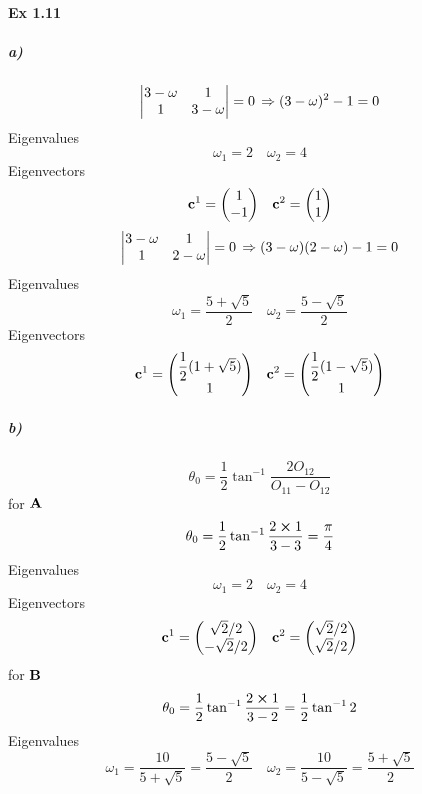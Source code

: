 \documentclass[a4paper]{article}
\DeclareMathOperator{\dra}{\Rightarrow}
\newcommand{\ex}[1]{\paragraph{Ex #1}}
\newcommand{\subex}[1]{\subparagraph{#1}}
\numberwithin{equation}{subsection}
\begin{document}
\ex{1.11}
\subex{a)}
\begin{equation}\label{key}
\mqty| 3-\omega & 1\\1 & 3-\omega| = 0 \;\dra\; (3-\omega)^2 - 1 = 0
\end{equation}
Eigenvalues
\begin{equation}\label{key}
\omega_1 = 2 \quad \omega_2 = 4
\end{equation}
Eigenvectors
\begin{equation}\label{key}
\vb{c}^1 = \mqty(1\\-1) \quad \vb{c}^2 = \mqty(1\\1)
\end{equation}
\begin{equation}\label{key}
\mqty|3-\omega & 1\\1 & 2-\omega| = 0 \;\dra\; (3-\omega)(2-\omega) - 1 = 0
\end{equation}
Eigenvalues
\begin{equation}\label{key}
\omega_1 = \dfrac{5+\sqrt{5}}{2} \quad \omega_2 = \dfrac{5-\sqrt{5}}{2}
\end{equation}
Eigenvectors
\begin{equation}\label{key}
\vb{c}^1 = \mqty(\dfrac{1}{2}(1+\sqrt{5})\\1) \quad \vb{c}^2 = \mqty(\dfrac{1}{2}(1-\sqrt{5})\\1)
\end{equation}
\subex{b)}
\begin{equation}\label{key}
\theta_0 = \dfrac{1}{2}\tan^{-1}\dfrac{2O_{12}}{O_{11}-O_{12}}
\end{equation}
for $ \vb{A} $
\begin{equation}\label{key}
\theta_0 = \dfrac{1}{2}\tan^{-1}\dfrac{2\cross 1}{3-3} = \dfrac{\pi}{4} 
\end{equation}
Eigenvalues
\begin{equation}\label{key}
\omega_1 = 2 \quad \omega_2 = 4
\end{equation}
Eigenvectors
\begin{equation}\label{key}
\vb{c}^1 = \mqty(\sqrt{2}/2\\-\sqrt{2}/2) \quad \vb{c}^2 = \mqty(\sqrt{2}/2\\ \sqrt{2}/2)
\end{equation}
for $ \vb{B} $
\begin{equation}\label{key}
\theta_0 = \dfrac{1}{2}\tan^{-1}\dfrac{2\cross 1}{3-2} = \dfrac{1}{2}\tan^{-1}2 
\end{equation}
Eigenvalues
\begin{equation}\label{key}
\omega_1 = \dfrac{10}{5+\sqrt{5}} = \dfrac{5-\sqrt{5}}{2} \quad \omega_2 = \dfrac{10}{5-\sqrt{5}} = \dfrac{5+\sqrt{5}}{2}
\end{equation}
\end{document}
